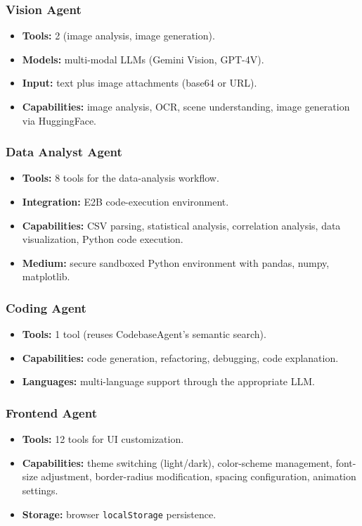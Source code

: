 \documentclass[11pt,a4paper]{report}
\newcommand{\code}[1]{\texttt{\small #1}}
\begin{document}
\subsubsection{Vision Agent}
\begin{itemize}
  \item \textbf{Tools:} 2 (image analysis, image generation).
  \item \textbf{Models:} multi-modal LLMs (Gemini Vision, GPT-4V).
  \item \textbf{Input:} text plus image attachments (base64 or URL).
  \item \textbf{Capabilities:} image analysis, OCR, scene understanding, image generation via HuggingFace.
\end{itemize}

\subsubsection{Data Analyst Agent}
\begin{itemize}
  \item \textbf{Tools:} 8 tools for the data-analysis workflow.
  \item \textbf{Integration:} E2B code-execution environment.
  \item \textbf{Capabilities:} CSV parsing, statistical analysis, correlation analysis, data visualization, Python code execution.
  \item \textbf{Medium:} secure sandboxed Python environment with pandas, numpy, matplotlib.
\end{itemize}

\subsubsection{Coding Agent}
\begin{itemize}
  \item \textbf{Tools:} 1 tool (reuses CodebaseAgent's semantic search).
  \item \textbf{Capabilities:} code generation, refactoring, debugging, code explanation.
  \item \textbf{Languages:} multi-language support through the appropriate LLM.
\end{itemize}

\subsubsection{Frontend Agent}
\begin{itemize}
  \item \textbf{Tools:} 12 tools for UI customization.
  \item \textbf{Capabilities:} theme switching (light/dark), color-scheme management, font-size adjustment, border-radius modification, spacing configuration, animation settings.
  \item \textbf{Storage:} browser \code{localStorage} persistence.
\end{itemize}
\end{document}
